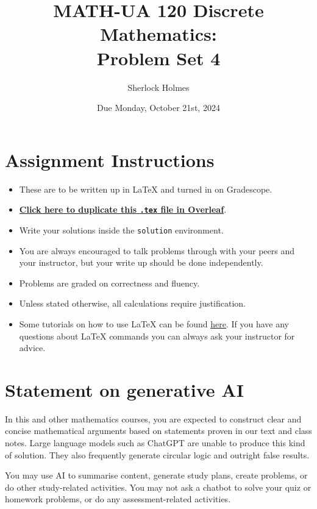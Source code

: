 \documentclass{article}
\title{\textbf{MATH-UA 120 Discrete Mathematics: \\ Problem Set 4}}
\author{%
    Sherlock Holmes %
}
\date{Due Monday, October 21st, 2024} %
\theoremstyle{definition}
\begin{document}
\maketitle %

\vfill

\section*{Assignment Instructions}

\begin{itemize}
    \item These are to be written up in \LaTeX{} and turned in on Gradescope.
    \item \href{https://bit.ly/3ALpQD3}{\textbf{Click here to duplicate this \texttt{.tex} file in Overleaf}}.
    \item Write your solutions inside the \texttt{solution} environment.
    \item You are always encouraged to talk problems through with your peers and your instructor, but your write up should be done independently.
    \item Problems are graded on correctness and fluency.
    \item Unless stated otherwise, all calculations require justification.
    \item Some tutorials on how to use \LaTeX{} can be found \href{https://www.overleaf.com/learn/latex/Tutorials}{\underline{here}}. If you have any questions about \LaTeX{} commands you can always ask your instructor for advice.
\end{itemize}

\vfill

\section*{Statement on generative AI}

In this and other mathematics courses, you are expected to construct clear and concise mathematical arguments based on statements proven in our text and class notes. Large language models such as ChatGPT are unable to produce this kind of solution. They also frequently generate circular logic and outright false results.
 
You may use AI to summarise content, generate study plans, create problems, or do other study-related activities. You may not ask a chatbot to solve your quiz or homework problems, or do any assessment-related activities.
 
\end{document}
